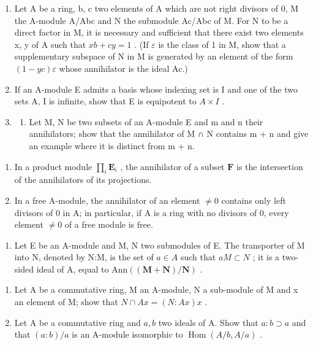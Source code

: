 \begin{enumerate}
\def\labelenumi{\arabic{enumi}.}
\setcounter{enumi}{20}
\item
  Let A be a ring, b, c two elements of A which are not right divisors of 0, M the A-module A/Abc and N the submodule Ac/Abc of M. For N to be a direct factor in M, it is necessary and sufficient that there exist two elements x, y of A such that \(xb + cy = 1\) . (If \(\varepsilon\) is the class of 1 in M, show that a supplementary subspace of N in M is generated by an element of the form \((1 - yc)\varepsilon\) whose annihilator is the ideal Ac.)
\item
  If an A-module E admits a basis whose indexing set is I and one of the two sets A, I is infinite, show that E is equipotent to \(A \times I\) .
\item
  \begin{enumerate}
  \def\labelenumii{(\alph{enumii})}
  \tightlist
  \item
    Let M, N be two subsets of an A-module E and m and n their annihilators; show that the annihilator of M ∩ N contains m + n and give an example where it is distinct from m + n.
  \end{enumerate}
\end{enumerate}

\begin{enumerate}
\def\labelenumi{(\alph{enumi})}
\setcounter{enumi}{1}
\item
  In a product module \(\prod_{i} \mathbf{E}_{i}\) , the annihilator of a subset \(\mathbf{F}\) is the intersection of the annihilators of its projections.
\item
  In a free A-module, the annihilator of an element \(\neq0\) contains only left divisors of 0 in A; in particular, if A is a ring with no divisors of 0, every element \(\neq0\) of a free module is free.
\end{enumerate}

\begin{enumerate}
\def\labelenumi{\arabic{enumi}.}
\setcounter{enumi}{23}
\tightlist
\item
  Let E be an A-module and M, N two submodules of E. The transporter of M into N, denoted by N:M, is the set of \(a \in A\) such that \(aM \subset N\) ; it is a two-sided ideal of A, equal to \(\text{Ann}((\mathbf{M} + \mathbf{N})/\mathbf{N})\) .
\end{enumerate}

\begin{enumerate}
\def\labelenumi{(\alph{enumi})}
\item
  Let A be a commutative ring, M an A-module, N a sub-module of M and x an element of M; show that \(N \cap Ax = (N:Ax)x\) .
\item
  Let A be a commutative ring and \(a, b\) two ideals of A. Show that \(a:b \supset a\) and that \((a:b)/a\) is an A-module isomorphic to \(\operatorname{Hom}(A/b, A/a)\) .
\end{enumerate}

